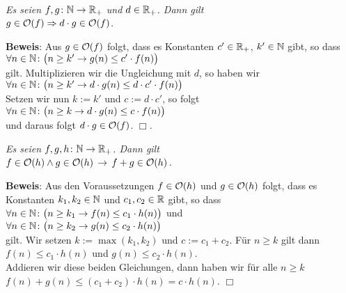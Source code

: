 \begin{Satz} \hspace*{\fill} \\
{\em
  Es seien  $f,g\colon {\mathbb N} \rightarrow {{\mathbb R}_+}$
   und $d \in {\mathbb R}_+$.  Dann gilt \\[0.1cm]
  \hspace*{1.3cm} $g \in \mathcal{O}(f) \Rightarrow d \cdot g \in \mathcal{O}(f)$.
}
\end{Satz}
\textbf{Beweis}: Aus $g \in \mathcal{O}(f)$ folgt, dass es Konstanten $c'\in {\mathbb R}_+$, $k'\in {\mathbb N}$ gibt,
so dass \\[0.1cm]
\hspace*{1.3cm} 
$\forall n \in {\mathbb N} \colon \bigl(n \geq k'  \rightarrow g(n) \leq c' \cdot f(n)\bigr)$ \\[0.1cm]
gilt.  Multiplizieren wir die Ungleichung mit $d$, so haben wir \\[0.1cm]
\hspace*{1.3cm} 
$\forall n \in {\mathbb N} \colon\bigl( n \geq k'  \rightarrow d \cdot g(n) \leq d \cdot c' \cdot f(n)\bigr)$ \\[0.1cm]
Setzen wir nun $k:=k'$ und $c := d \cdot c'$, so folgt \\[0.1cm]
\hspace*{1.3cm} $\forall n \in {\mathbb N} \colon \bigl(n \geq k  \rightarrow d \cdot g(n) \leq c \cdot f(n)\bigr)$ 
\\[0.1cm]
und daraus folgt $d \cdot g \in \mathcal{O}(f)$. \hspace*{\fill} $\Box$.

\begin{Satz}
{\em
  Es seien $f,g,h \colon {\mathbb N} \rightarrow {{\mathbb R}_+}$.  Dann gilt \\[0.1cm]
  \hspace*{1.3cm} $f \in \mathcal{O}(h) \wedge g \in \mathcal{O}(h) \,\rightarrow\, f + g \in \mathcal{O}(h)$.
}
\end{Satz}
\textbf{Beweis}: Aus den Voraussetzungen $f \in \mathcal{O}(h)$ und $g \in \mathcal{O}(h)$ folgt, dass es
Konstanten $k_1,k_2\in {\mathbb N}$ und $c_1,c_2\in {\mathbb R}$ gibt, so dass \\[0.1cm]
\hspace*{1.3cm} 
$\forall n \in {\mathbb N} \colon \bigl( n \geq k_1 \rightarrow f(n) \leq c_1 \cdot h(n)\bigr)$ 
\quad und\\[0.1cm]
\hspace*{1.3cm} 
$\forall n \in {\mathbb N} \colon\bigl( n \geq k_2 \rightarrow g(n) \leq c_2 \cdot h(n)\bigr)$
\\[0.1cm]
gilt.  Wir setzen $k := \max(k_1,k_2)$ und $c:= c_1 + c_2$.  F\"ur $n \geq k$ gilt dann \\[0.1cm]
\hspace*{1.3cm} $f(n) \leq c_1 \cdot h(n)$ und $g(n) \leq c_2 \cdot h(n)$. \\[0.1cm]
Addieren wir diese beiden Gleichungen, dann haben wir f\"ur alle $n \geq k$ \\[0.1cm]
\hspace*{1.3cm} $f(n) + g(n) \leq (c_1 + c_2) \cdot h(n) = c \cdot h(n)$. \hspace*{\fill} $\Box$

